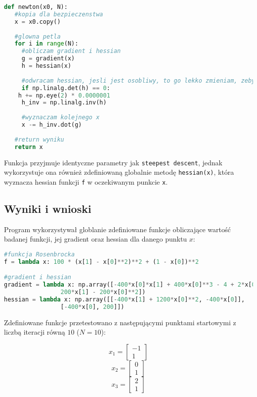 \documentclass{article}
\begin{document}
	\begin{lstlisting}[language=Python]
def newton(x0, N):
   #kopia dla bezpieczenstwa
   x = x0.copy()
		
   #glowna petla
   for i in range(N):
     #obliczam gradient i hessian
     g = gradient(x)
     h = hessian(x)
	  
     #odwracam hessian, jesli jest osobliwy, to go lekko zmieniam, zeby byl odwracalny
     if np.linalg.det(h) == 0:
   	h += np.eye(2) * 0.0000001
     h_inv = np.linalg.inv(h)
	  
     #wyznaczam kolejnego x
     x -= h_inv.dot(g)
		
   #return wyniku
   return x
	\end{lstlisting}

	Funkcja przyjmuje identyczne parametry jak \texttt{steepest descent}, jednak wykorzystuje ona również zdefiniowaną globalnie metodę \texttt{hessian(x)}, która wyznacza hessian funkcji \texttt{f} w oczekiwanym punkcie \texttt{x}.

	\subsection*{Wyniki i wnioski}

	Program wykorzystywał globlanie zdefiniowane funkcje obliczające wartość badanej funkcji, jej gradient oraz hessian dla danego punktu $x$:

	\begin{lstlisting}[language=Python]
#funkcja Rosenbrocka
f = lambda x: 100 * (x[1] - x[0]**2)**2 + (1 - x[0])**2

#gradient i hessian
gradient = lambda x: np.array([-400*x[0]*x[1] + 400*x[0]**3 - 4 + 2*x[0],
				200*x[1] - 200*x[0]**2])
hessian = lambda x: np.array([[-400*x[1] + 1200*x[0]**2, -400*x[0]], 
				[-400*x[0], 200]])

	\end{lstlisting}

	Zdefiniowane funkcje przetestowano z następującymi punktami startowymi z liczbą iteracji równą $10$ ($N=10$):

	\begin{equation}
		x_1 = \begin{bmatrix} -1 \\ 1 \end{bmatrix}
	\end{equation}
	\begin{equation}
		x_2 = \begin{bmatrix} 0 \\ 1 \end{bmatrix}
	\end{equation}
	\begin{equation}
		x_3 = \begin{bmatrix} 2 \\ 1 \end{bmatrix}
	\end{equation}
\end{document}
